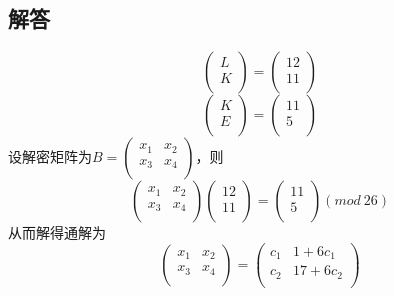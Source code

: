 \documentclass[12pt]{article}
\begin{document}
    \subsection*{解答}
        $$
        \begin{pmatrix}
            L\\
            K\\
        \end{pmatrix}    
        =
        \begin{pmatrix}
            12\\
            11\\
        \end{pmatrix}
        $$
        $$
        \begin{pmatrix}
            K\\
            E\\
        \end{pmatrix}
        =
        \begin{pmatrix}
            11\\
            5\\
        \end{pmatrix}
        $$
        设解密矩阵为$B = \begin{pmatrix} x_{1} & x_{2} \\ x_{3} & x_{4} \\\end{pmatrix}$，则\\
        $$
        \begin{pmatrix}
            x_{1} & x_{2} \\
            x_{3} & x_{4} \\
        \end{pmatrix}
        \begin{pmatrix}
            12 \\
            11 \\
        \end{pmatrix}
        =
        \begin{pmatrix}
            11 \\
            5 \\
        \end{pmatrix}
        (mod \ 26)
        $$
        从而解得通解为
        $$
        \begin{pmatrix}
            x_{1} & x_{2} \\
            x_{3} & x_{4} \\
        \end{pmatrix}
        =
        \begin{pmatrix}
            c_{1} & 1+6c_{1} \\
            c_{2} & 17+6c_{2} \\
        \end{pmatrix} 
        $$
\end{document}
